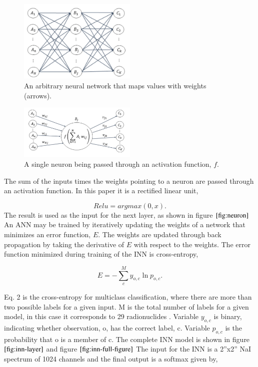 \documentclass{anstrans}
\begin{document}
\begin{figure}[h]
\centering
\includegraphics[width=0.5\textwidth]{dense-layer-figure.png}
\caption{An arbitrary neural network that maps values with weights (arrows).}
\label{fig:dense-nn}
\end{figure}
\begin{figure}[h]
\centering
\includegraphics[width=0.5\textwidth]{neuron-figure.png}
\caption{A single neuron being passed through an activation function, $\textit{f}$.}
\label{fig:neuron}
\end{figure}

The sum of the inputs times the weights pointing to a neuron are passed through an activation function.
In this paper it is a rectified linear unit,

\begin{equation}
Relu = argmax(0, x).
\end{equation}
The result is used as the input for the next layer, as shown in figure $\ref{fig:neuron}$ 
An ANN may be trained by iteratively updating the weights of a network that minimizes an error function, $E$. 
The weights are updated through back propagation by taking the derivative of $E$ with respect to the weights. 
The error function minimized during training of the INN is cross-entropy,

\begin{equation}
E = -\sum_{c}^{M}y_{o,c}\ln{p_{o,c}}.
\end{equation}


Eq. 2 is the cross-entropy for multiclass classification, where there are more than two possible labels 
for a given input. M is the total number of labels for a given model, in this case it corresponds to 29 
radionuclides \cite{AmericanNationalStandard2016}. Variable $y_{o,c}$ is binary, indicating whether observation, o, has the correct label, c. 
Variable $p_{o,c}$ is the probability that o is a member of c. The complete INN model is shown in figure $\ref{fig:inn-layer}$ and figure $\ref{fig:inn-full-figure}$ 
The input for the INN is a 2”x2” NaI spectrum of 1024 channels and the final output is a softmax given by,
\end{document}

